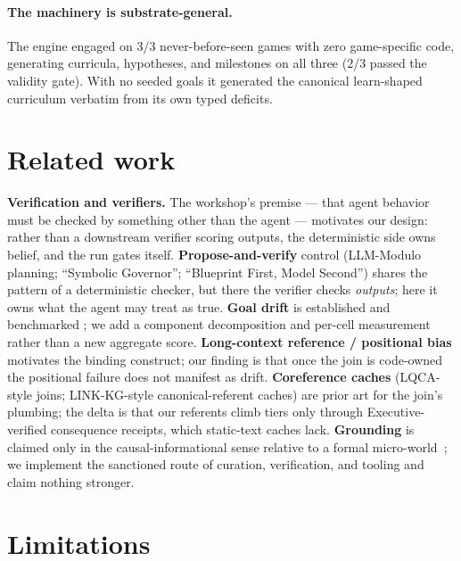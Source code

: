 \documentclass{article}
\begin{document}
\paragraph{The machinery is substrate-general.} The engine engaged on 3/3
never-before-seen games with zero game-specific code, generating curricula,
hypotheses, and milestones on all three (2/3 passed the validity gate). With no
seeded goals it generated the canonical learn-shaped curriculum verbatim from its
own typed deficits.

\section{Related work}

\textbf{Verification and verifiers.} The workshop's premise --- that agent
behavior must be checked by something other than the agent --- motivates our design:
rather than a downstream verifier scoring outputs, the deterministic side owns
belief, and the run gates itself. \textbf{Propose-and-verify} control (LLM-Modulo
planning; ``Symbolic Governor''; ``Blueprint First, Model Second'') shares the
pattern of a deterministic checker, but there the verifier checks \emph{outputs};
here it owns what the agent may treat as true. \textbf{Goal drift} is established
and benchmarked \citep{arike2025goaldrift,menon2026inherited}; we add a component
decomposition and per-cell measurement rather than a new aggregate score.
\textbf{Long-context reference / positional bias}
\citep{longpibench2024,liu2023lost} motivates the binding construct; our finding is
that once the join is code-owned the positional failure does not manifest as drift.
\textbf{Coreference caches} (LQCA-style joins; LINK-KG-style canonical-referent
caches) are prior art for the join's plumbing; the delta is that our referents
climb tiers only through Executive-verified consequence receipts, which static-text
caches lack. \textbf{Grounding} is claimed only in the causal-informational sense
relative to a formal micro-world~\citep{floridi2025categorical}; we implement the
sanctioned route of curation, verification, and tooling and claim nothing stronger.

\section{Limitations}
\end{document}
